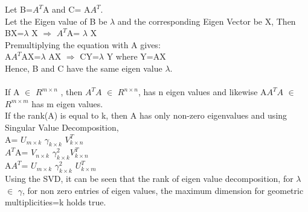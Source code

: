 Let B=$A^T$A and C= A$A^T$. \\
Let the Eigen value of B be $\lambda$ and the corresponding Eigen Vector be X, Then \\
BX=$\lambda$ X  $\Rightarrow$  $A^T$A= $\lambda$ X \\
Premultiplying the equation with A gives: \\
A$A^T$AX=$\lambda$ AX    $\Rightarrow$ CY=$\lambda$ Y
where Y=AX \\
Hence, B and C have the same eigen value $\lambda$. \\\\
If A $\in$ $R^{m \times n}$ , then $A^TA$ $\in$ $R^{n \times n}$, has n eigen values and likewise A$A^TA $ $\in$  $R^{m \times m}$ has m eigen values.\\
If the rank(A) is equal to k, then A has only  non-zero eigenvalues and using Singular Value Decomposition,\\
A= $U_{m \times k} $ $\gamma_{k \times k} $ $V^T_{k \times n} $ \\
$A^T$A= $V_{n \times k}$ $\gamma^2_{k \times k}$$ V^T_{k \times n}$\\
A$A^T$= $U_{m \times k}$ $\gamma^2_{k \times k}$ $U^T_{k \times m}$\\
Using the SVD, it can be seen that the rank of eigen value decomposition, for $\lambda$ $\in$ $\gamma$, for non zero entries of eigen values, the maximum dimension for geometric multiplicities=k holds true.

